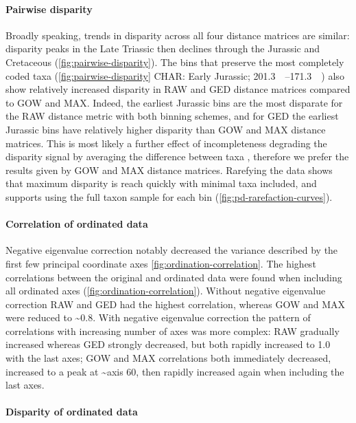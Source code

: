 \documentclass[british,a4paper]{article}
\newcommand\pcref[1]{(\cref{#1})}
\begin{document}
\paragraph{Pairwise disparity}\label{par:pairwise-disparity}

Broadly speaking, trends in disparity across all four distance matrices are
similar: disparity peaks in the Late Triassic then declines through the Jurassic
and Cretaceous \pcref{fig:pairwise-disparity}. The bins that preserve the most
completely coded taxa (\cref{fig:pairwise-disparity} CHAR\@: Early Jurassic;
\SIrange{201.3}{171.3}{\mega\annum}) also show relatively increased disparity in
RAW and GED distance matrices compared to GOW and MAX\@. Indeed, the earliest
Jurassic bins are the most disparate for the RAW distance metric with both
binning schemes, and for GED the earliest Jurassic bins have relatively higher
disparity than GOW and MAX distance matrices. This is most likely a further
effect of incompleteness degrading the disparity signal by averaging the
difference between taxa \autocite{FlannerySutherland2019PRSBBS, Lehmann2019P},
therefore we prefer the results given by GOW and MAX distance matrices.
Rarefying the data shows that maximum disparity is reach quickly with minimal
taxa included, and supports using the full taxon sample for each bin
\pcref{fig:pd-rarefaction-curves}.

\paragraph{Correlation of ordinated data}\label{par:pco-correlation}

Negative eigenvalue correction notably decreased the variance described by the
first few principal coordinate axes \cref{fig:ordination-correlation}. The
highest correlations between the original and ordinated data were found when
including all ordinated axes \pcref{fig:ordination-correlation}. Without
negative eigenvalue correction RAW and GED had the highest correlation, whereas
GOW and MAX were reduced to \textasciitilde{}0.8. With negative eigenvalue
correction the pattern of correlations with increasing number of axes was more
complex: RAW gradually increased whereas GED strongly decreased, but both
rapidly increased to 1.0 with the last axes; GOW and MAX correlations both
immediately decreased, increased to a peak at \textasciitilde{}axis 60, then
rapidly increased again when including the last axes.

\paragraph{Disparity of ordinated data}\label{par:ordinated-disparity}
\end{document}
